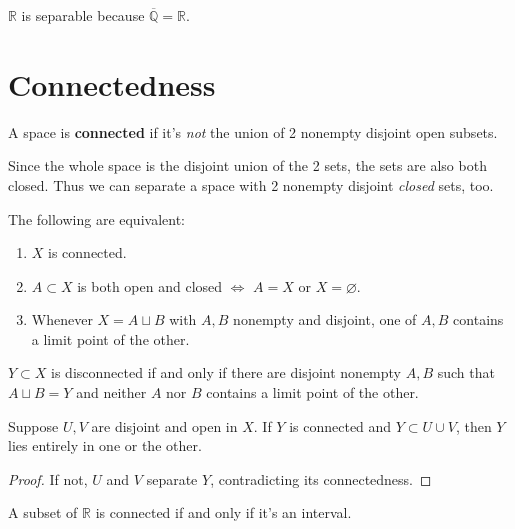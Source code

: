 \documentclass[twoside,10pt]{report}
\begin{document}
\begin{ex}[]
$\mathbb{R}$ is separable because $\overline{\mathbb{Q}} =\mathbb{R}$.
\end{ex}



\section{Connectedness}

\begin{defn}[]
	A space is \textbf{connected} if it's \textit{not} the union of 2 nonempty disjoint open subsets.
\end{defn}

Since the whole space is the disjoint union of the 2 sets, the sets are also both closed. Thus we can separate a space with 2 nonempty disjoint \textit{closed} sets, too.

\begin{thrm}[]
The following are equivalent:
\begin{enumerate}
	\item $X$ is connected.
	\item $A \subset X$ is both open and closed $\iff$ $A=X$ or $X=\varnothing$.
	\item Whenever $X = A \sqcup B$ with $A,B$ nonempty and disjoint, one of $A,B$ contains a limit point of the other.
\end{enumerate}
\end{thrm}

\begin{prop}
	$Y \subset X$ is disconnected if and only if there are disjoint nonempty $A,B$ such that $A \sqcup B = Y$ and neither $A$ nor $B$ contains a limit point of the other.
\end{prop}

\begin{prop}
	Suppose $U,V$ are disjoint and open in $X$. If $Y$ is connected and $Y \subset U \cup V$, then $Y$ lies entirely in one or the other.
\end{prop}
\begin{proof}
	If not, $U$ and $V$ separate $Y$, contradicting its connectedness.
\end{proof}

\begin{thrm}[]
A subset of $\mathbb{R}$ is connected if and only if it's an interval.
\end{thrm}
\end{document}
